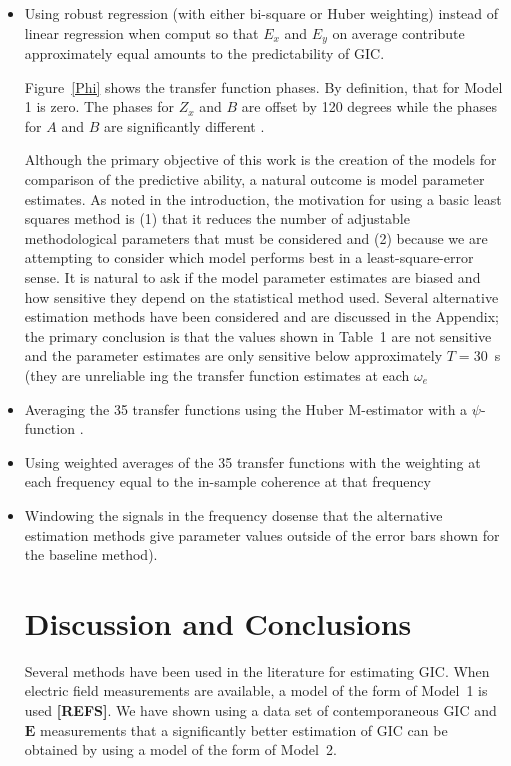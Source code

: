 \documentclass[draft,linenumbers]{agujournal2018}
\begin{document}
\begin{itemize}
\item Using robust regression (with either bi-square or Huber weighting) instead of linear regression when comput so that $E_x$ and $E_y$ on average contribute approximately equal amounts to the predictability of GIC. 

Figure~\ref{Phi} shows the transfer function phases. By definition, that for Model 1 is zero. The phases for $Z_x$ and $B$ are offset by 120 degrees  while the phases for $A$ and $B$ are significantly different .

Although the primary objective of this work is the creation of the models for comparison of the predictive ability, a natural outcome is model parameter estimates. As noted in the introduction, the motivation for using a basic least squares method is (1) that it reduces the number of adjustable methodological parameters that must be considered and (2) because we are attempting to consider which model performs best in a least-square-error sense. It is natural to ask if the model parameter estimates are biased and how sensitive they depend on the statistical method used. Several alternative estimation methods have been considered and are discussed in the Appendix; the primary conclusion is that the values shown in Table~1 are not sensitive and the parameter estimates are only sensitive below approximately $T=30$~s (they are unreliable ing the transfer function estimates at each $\omega_e$

\item Averaging the 35 transfer functions using the Huber M-estimator with a $\psi$-function \citep{Huber2011}. 

\item Using weighted averages of the 35 transfer functions with the weighting at each frequency equal to the in-sample coherence at that frequency

\item Windowing the signals in the frequency dosense that the alternative estimation methods give parameter values outside of the error bars shown for the baseline method).

\section{Discussion and Conclusions}

Several methods have been used in the literature for estimating GIC. When electric field measurements are available, a model of the form of Model~1 is used  {\color{red} \textbf{[REFS]}}. We have shown using a data set of contemporaneous GIC and $\mathbf{E}$ measurements that a significantly better estimation of GIC can be obtained by using a model of the form of Model~2.


\end{itemize}
\end{document}
